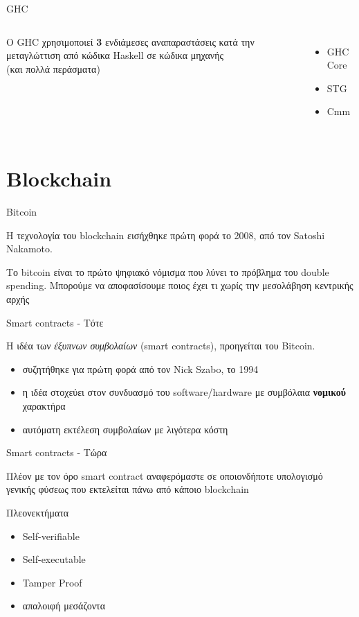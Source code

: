 \documentclass[10pt]{beamer}
\begin{document}
{\begin{frame}{GHC}
\begin{columns}[T,onlytextwidth]
      O GHC χρησιμοποιεί \textbf{3} ενδιάμεσες αναπαραστάσεις κατά
      την μεταγλώττιση από κώδικα Haskell σε κώδικα μηχανής
\\
(και πολλά περάσματα)
      \begin{itemize}
        \item GHC Core
        \item STG
        \item Cmm
      \end{itemize}
  \end{columns}
\end{frame}
}

\section{Blockchain}

\begin{frame}[fragile]{Bitcoin}

Η τεχνολογία του blockchain εισήχθηκε πρώτη φορά το 2008, από τον Satoshi Nakamoto.

Το bitcoin είναι το πρώτο ψηφιακό νόμισμα που λύνει το πρόβλημα του double
spending.
Μπορούμε να αποφασίσουμε ποιος έχει τι χωρίς την μεσολάβηση κεντρικής αρχής

\end{frame}

\begin{frame}[fragile]{Smart contracts - Τότε}

    Η ιδέα των \textit{έξυπνων συμβολαίων} (smart contracts), προηγείται του Bitcoin.
    \begin{itemize}
        \item συζητήθηκε για πρώτη φορά από τον Nick Szabo, το 1994
        \item η ιδέα στοχεύει στον συνδυασμό του software/hardware με
        συμβόλαια \textbf{νομικού} χαρακτήρα
        \item αυτόματη εκτέλεση συμβολαίων με λιγότερα κόστη
    \end{itemize}

\end{frame}

\begin{frame}[fragile]{Smart contracts - Τώρα}

    Πλέον με τον όρο smart contract αναφερόμαστε σε οποιονδήποτε
    υπολογισμό γενικής φύσεως που εκτελείται πάνω από κάποιο blockchain



\begin{alertblock}{Πλεονεκτήματα}
    \begin{itemize}
        \item Self-verifiable
        \item  Self-executable
        \item Tamper Proof
        \item \alert{απαλοιφή μεσάζοντα}
    \end{itemize}
\end{alertblock}

\end{frame}
\end{document}
